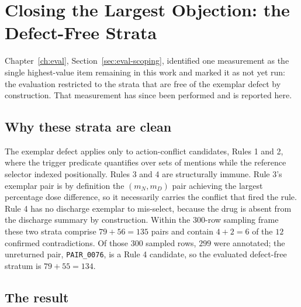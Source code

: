 \section{Closing the Largest Objection: the Defect-Free Strata}
\label{sec:disc-strata}

Chapter~\ref{ch:eval}, Section~\ref{sec:eval-scoping}, identified one
measurement as the single highest-value item remaining in this work and marked
it as not yet run: the evaluation restricted to the strata that are free of the
exemplar defect by construction. That measurement has since been performed and
is reported here.

\subsection{Why these strata are clean}

The exemplar defect applies only to action-conflict candidates, Rules 1 and 2,
where the trigger predicate quantifies over sets of mentions while the reference
selector indexed positionally. Rules 3 and 4 are structurally immune. Rule 3's
exemplar pair is by definition the $(m_N, m_D)$ pair achieving the largest
percentage dose difference, so it necessarily carries the conflict that fired
the rule. Rule 4 has no discharge exemplar to mis-select, because the drug is
absent from the discharge summary by construction. Within the $300$-row
sampling frame these two strata comprise $79 + 56 = 135$ pairs and contain
$4 + 2 = 6$ of the $12$ confirmed contradictions. Of those $300$ sampled rows,
$299$ were annotated; the unreturned pair, \texttt{PAIR\_0076}, is a Rule 4
candidate, so the evaluated defect-free stratum is $79 + 55 = 134$.

\subsection{The result}

